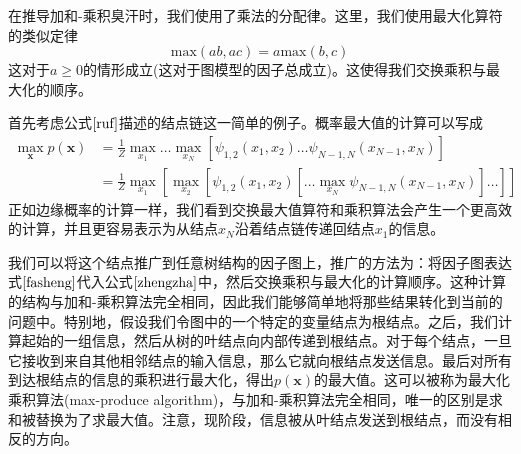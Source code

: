 在推导加和-乘积臭汗时，我们使用了乘法的分配律。这里，我们使用最大化算符的类似定律
\begin{equation}
	\mathrm{max}(ab,ac)=a\mathrm{max}(b,c)
\end{equation}
这对于$a\geqslant 0$的情形成立(这对于图模型的因子总成立)。这使得我们交换乘积与最大化的顺序。

首先考虑公式$\ref{ruf}$描述的结点链这一简单的例子。概率最大值的计算可以写成
\begin{equation}
	\begin{aligned}
	\mathop{\mathrm{max}}\limits_{\boldsymbol{x}}p(\boldsymbol{x})&=\frac{1}{Z}\mathop{\mathrm{max}}\limits_{x_1}\dots\mathop{\mathrm{max}}\limits_{x_N}[\psi_{1,2}(x_1,x_2)\dots\psi_{N-1,N}(x_{N-1},x_N)]\\
	&=\frac{1}{Z}\mathop{\mathrm{max}}\limits_{x_1}\left[\mathop{\mathrm{max}}\limits_{x_2}\left[\psi_{1,2}(x_1,x_2)\left[\dots\mathop{\mathrm{max}}\limits_{x_N}\psi_{N-1,N}(x_{N-1},x_N) \right]\dots \right] \right]
	\end{aligned}
\end{equation}
正如边缘概率的计算一样，我们看到交换最大值算符和乘积算法会产生一个更高效的计算，并且更容易表示为从结点$x_N$沿着结点链传递回结点$x_1$的信息。

我们可以将这个结点推广到任意树结构的因子图上，推广的方法为：将因子图表达式$\ref{fasheng}$代入公式$\ref{zhengzha}$中，然后交换乘积与最大化的计算顺序。这种计算的结构与加和-乘积算法完全相同，因此我们能够简单地将那些结果转化到当前的问题中。特别地，假设我们令图中的一个特定的变量结点为根结点。之后，我们计算起始的一组信息，然后从树的叶结点向内部传递到根结点。对于每个结点，一旦它接收到来自其他相邻结点的输入信息，那么它就向根结点发送信息。最后对所有到达根结点的信息的乘积进行最大化，得出$p(\boldsymbol{x})$的最大值。这可以被称为最大化乘积算法(max-produce algorithm)，与加和-乘积算法完全相同，唯一的区别是求和被替换为了求最大值。注意，现阶段，信息被从叶结点发送到根结点，而没有相反的方向。

